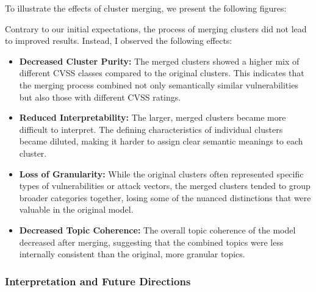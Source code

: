 To illustrate the effects of cluster merging, we present the following figures:



Contrary to our initial expectations, the process of merging clusters did not lead to improved
results. Instead, I observed the following effects:

\begin{itemize}
	\item \textbf{Decreased Cluster Purity:} The merged clusters showed a higher mix of different CVSS classes compared to the original clusters. This indicates that the merging process combined not only semantically similar vulnerabilities but also those with different CVSS ratings.

	\item \textbf{Reduced Interpretability:} The larger, merged clusters became more difficult to interpret. The defining characteristics of individual clusters became diluted, making it harder to assign clear semantic meanings to each cluster.

	\item \textbf{Loss of Granularity:} While the original clusters often represented specific types of vulnerabilities or attack vectors, the merged clusters tended to group broader categories together, losing some of the nuanced distinctions that were valuable in the original model.

	\item \textbf{Decreased Topic Coherence:} The overall topic coherence of the model decreased after merging, suggesting that the combined topics were less internally consistent than the original, more granular topics.
\end{itemize}

\subsubsection{Interpretation and Future Directions}


